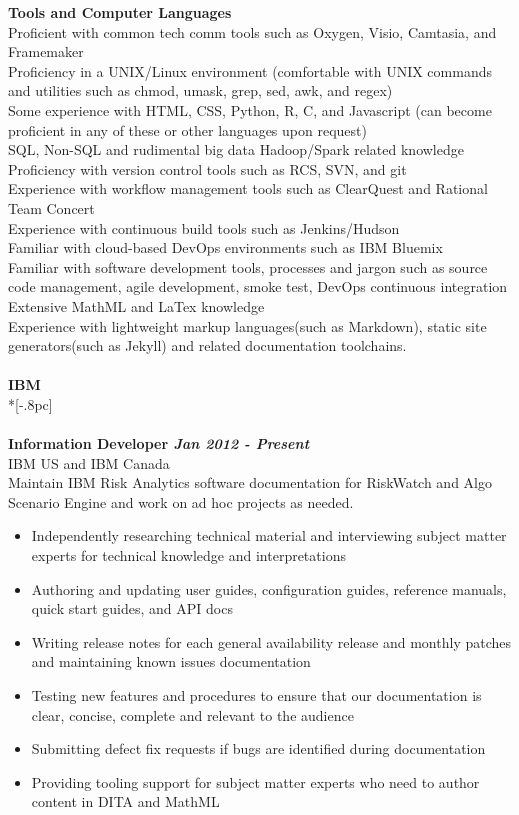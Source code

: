 \documentclass[11pt]{extarticle}
\begin{document}
{\bf Tools and Computer Languages} \\
Proficient with common tech comm tools such as Oxygen, Visio, Camtasia, and Framemaker\\
Proficiency in a UNIX/Linux environment (comfortable with UNIX commands and utilities such as chmod, umask, grep, sed, awk, and regex)\\
Some experience with HTML, CSS, Python, R, C, and Javascript (can become proficient in any of these or other languages upon request)\\
SQL, Non-SQL and rudimental big data Hadoop/Spark related knowledge\\
Proficiency with version control tools such as RCS, SVN, and git\\
Experience with workflow management tools such as ClearQuest and Rational Team Concert \\
Experience with continuous build tools such as Jenkins/Hudson \\
Familiar with cloud-based DevOps environments such as IBM Bluemix  \\
Familiar with software development tools, processes and jargon such as source code management, agile development, smoke test, DevOps continuous integration \\
Extensive MathML and LaTex knowledge\\
Experience with lightweight markup languages(such as Markdown), static site generators(such as Jekyll) and related documentation toolchains.\\
\\
{\large \bf IBM }  \\*[-.8pc]
\underline{\hspace{6.55in}} \\
\\
{\bf Information Developer \hfill \it Jan 2012 - Present}  \\
IBM US and IBM Canada \\
Maintain IBM Risk Analytics software documentation for RiskWatch and Algo Scenario Engine and work on ad hoc projects as needed. 
\begin{itemize} 
\setlength{\itemsep}{0pt}
\item Independently researching technical material and interviewing subject matter experts for technical knowledge and interpretations
  \item Authoring and updating user guides,  configuration guides, reference manuals, quick start guides, and API docs
  \item Writing release notes for each general availability release and monthly patches and maintaining known issues documentation 
  \item Testing new features and procedures to ensure that our documentation is clear, concise, complete and relevant to the audience
	\item Submitting defect fix requests if bugs are identified during documentation 
	\item Providing tooling support for subject matter experts who need to author content in DITA and MathML \\
\end{itemize}
\end{document}
